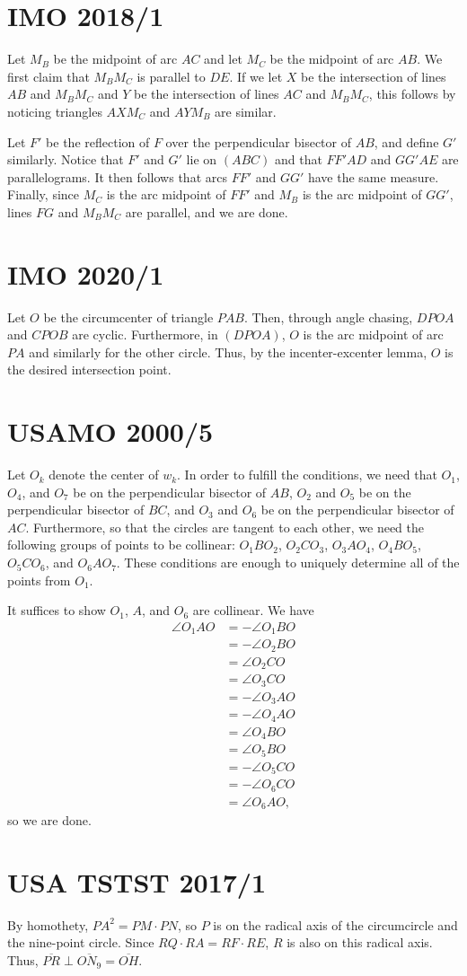 \documentclass{scrartcl}
\begin{document}
\section*{IMO 2018/1}
Let $M_B$ be the midpoint of arc $AC$ and let $M_C$ be the midpoint of arc $AB$.
We first claim that $M_BM_C$ is parallel to $DE$.
If we let $X$ be the intersection of lines $AB$ and $M_BM_C$ and $Y$ be the intersection of lines $AC$ and $M_BM_C$, this follows by noticing triangles $AXM_C$ and $AYM_B$ are similar.

Let $F'$ be the reflection of $F$ over the perpendicular bisector of $AB$, and define $G'$ similarly.
Notice that $F'$ and $G'$ lie on $(ABC)$ and that $FF'AD$ and $GG'AE$ are parallelograms.
It then follows that arcs $FF'$ and $GG'$ have the same measure.
Finally, since $M_C$ is the arc midpoint of $FF'$ and $M_B$ is the arc midpoint of $GG'$, lines $FG$ and $M_BM_C$ are parallel, and we are done.

\section*{IMO 2020/1}
Let $O$ be the circumcenter of triangle $PAB$.
Then, through angle chasing, $DPOA$ and $CPOB$ are cyclic.
Furthermore, in $(DPOA)$, $O$ is the arc midpoint of arc $PA$ and similarly for the other circle.
Thus, by the incenter-excenter lemma, $O$ is the desired intersection point.

\section*{USAMO 2000/5}
Let $O_k$ denote the center of $w_k$.
In order to fulfill the conditions, we need that $O_1$, $O_4$, and $O_7$ be on the perpendicular bisector of $AB$,
$O_2$ and $O_5$ be on the perpendicular bisector of $BC$, and $O_3$ and $O_6$ be on the perpendicular bisector of $AC$.
Furthermore, so that the circles are tangent to each other, we need the following groups of points to be collinear: $O_1BO_2$, $O_2CO_3$, $O_3AO_4$, $O_4BO_5$, $O_5CO_6$, and $O_6AO_7$.
These conditions are enough to uniquely determine all of the points from $O_1$.

It suffices to show $O_1$, $A$, and $O_6$ are collinear.
We have
\begin{align*}
    \angle O_1AO &= -\angle O_1BO \\
    &= -\angle O_2BO \\
    &= \angle O_2CO \\
    &= \angle O_3CO \\
    &= -\angle O_3AO \\
    &= -\angle O_4AO \\
    &= \angle O_4BO \\
    &= \angle O_5BO \\
    &= -\angle O_5CO \\
    &= -\angle O_6CO \\
    &= \angle O_6AO,
\end{align*}
so we are done.

\section*{USA TSTST 2017/1}
By homothety, $PA^2 = PM \cdot PN$, so $P$ is on the radical axis of the circumcircle and the nine-point circle.
Since $RQ \cdot RA = RF \cdot RE$, $R$ is also on this radical axis.
Thus, $\overline{PR} \perp \overline{ON_9} = \overline{OH}$.
\end{document}
